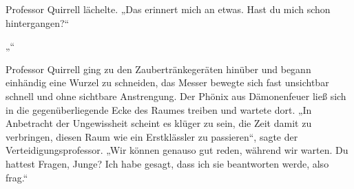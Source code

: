 Professor Quirrell lächelte.
„Das erinnert mich an etwas. Hast du mich schon hintergangen?“

„“

Professor Quirrell ging zu den Zaubertränkegeräten hinüber und begann einhändig eine Wurzel zu schneiden, das Messer bewegte sich fast unsichtbar schnell und ohne sichtbare Anstrengung. Der Phönix aus Dämonenfeuer ließ sich in die gegenüberliegende Ecke des Raumes treiben und wartete dort.
„In Anbetracht der Ungewissheit scheint es klüger zu sein, die Zeit damit zu verbringen, diesen Raum wie ein Erstklässler zu passieren“, sagte der Verteidigungsprofessor. „Wir können genauso gut reden, während wir warten. Du hattest Fragen, Junge? Ich habe gesagt, dass ich sie beantworten werde, also frag.“

